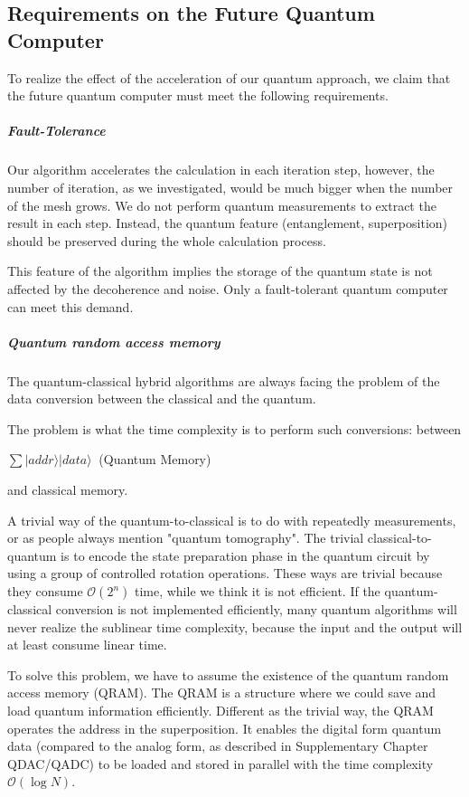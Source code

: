 \documentclass[%
 reprint,
 amsmath,amssymb,
pra,
]{revtex4-1}
\begin{document}
\subsection{Requirements on the Future Quantum Computer}

To realize the effect of the acceleration of our quantum approach, we claim that the future quantum computer must meet the following requirements.

\subparagraph{Fault-Tolerance} Our algorithm accelerates the calculation in each iteration step, however, the number of iteration, as we investigated, would be much bigger when the number of the mesh grows. We do not perform quantum measurements to extract the result in each step. Instead, the quantum feature (entanglement, superposition) should be preserved during the whole calculation process. 

This feature of the algorithm implies the storage of the quantum state is not affected by the decoherence and noise. Only a fault-tolerant quantum computer can meet this demand.

\subparagraph{Quantum random access memory} The quantum-classical hybrid algorithms are always facing the problem of the data conversion between the classical and the quantum.

The problem is what the time complexity is to perform such conversions: between
\begin{center}
$ \sum|addr\rangle|data\rangle\ $ (Quantum Memory) 
\end{center}
and classical memory.

A trivial way of the quantum-to-classical is to do with repeatedly measurements, or as people always mention "quantum tomography". The trivial classical-to-quantum is to encode the state preparation phase in the quantum circuit by using a group of controlled rotation operations. These ways are trivial because they consume $\mathcal{O}(2^n)$ time, while we think it is not efficient. If the quantum-classical conversion is not implemented efficiently, many quantum algorithms will never realize the sublinear time complexity, because the input and the output will at least consume linear time.

To solve this problem, we have to assume the existence of the quantum random access memory (QRAM). The QRAM is a structure where we could save and load quantum information efficiently. Different as the trivial way, the QRAM operates the address in the superposition. It enables the digital form quantum data (compared to the analog form, as described in Supplementary Chapter QDAC/QADC\cite{mitarai2019quantum, martin2019digital}) to be loaded and stored in parallel with the time complexity $\mathcal{O}(\log N)$.
\end{document}
